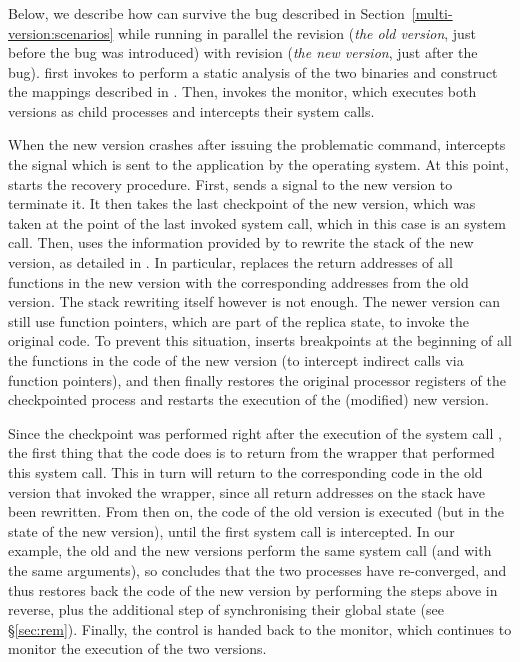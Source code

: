 \subsubsection{\redis}
\label{sec:redis}

Below, we describe how \mx can survive the \redis bug described in
Section~\ref{multi-version:scenarios} while running in parallel the \redis
revision  (\textit{the old version}, just before the bug was
introduced) with revision  (\textit{the new version}, just
after the bug).  \mx first invokes \sea to perform a static analysis of the two
binaries and construct the mappings described in .  Then, \mx
invokes the \mxm monitor, which executes both versions as child processes and
intercepts their system calls.

When the new version crashes after issuing the problematic
 command, \mxm intercepts the  signal
which is sent to the application by the operating system.  At
this point, \rem starts the recovery procedure.  First, \rem sends a
 signal to the new version to terminate it.  It then
takes the last checkpoint of the new version, which was taken at the
point of the last invoked system call, which in this case is an
 system call.  Then, \rem uses the information
provided by \sea to rewrite the stack of the new version, as detailed
in .  In particular, \rem replaces the return
addresses of all functions in the new version with the corresponding
addresses from the old version. The stack rewriting itself however is not
enough. The newer version can still use function pointers, which are part of
the replica state, to invoke the original code. To prevent this situation, \rem
inserts breakpoints at the beginning of all the functions in the code of the
new version (to intercept indirect calls via function pointers), and then
finally restores the original processor registers of the checkpointed process
and restarts the execution of the (modified) new version.

Since the checkpoint was performed right after the execution of the system
call , the first thing that the code does is to
return from the  wrapper that performed this system
call.  This in turn will return to the corresponding code in the old
version that invoked the wrapper, since all return addresses on the
stack have been rewritten.  From then on, the code of the old version
is executed (but in the state of the new version), until the first
system call is intercepted.  In our example, the old and the new
versions perform the same system call (and with the same arguments),
so \rem concludes that the two processes have re-converged, and thus
restores back the code of the new version by performing the steps
above in reverse, plus the additional step of synchronising their
global state (see \S\ref{sec:rem}).  Finally, the control is handed
back to the \mxm monitor, which continues to monitor the execution of
the two versions.

